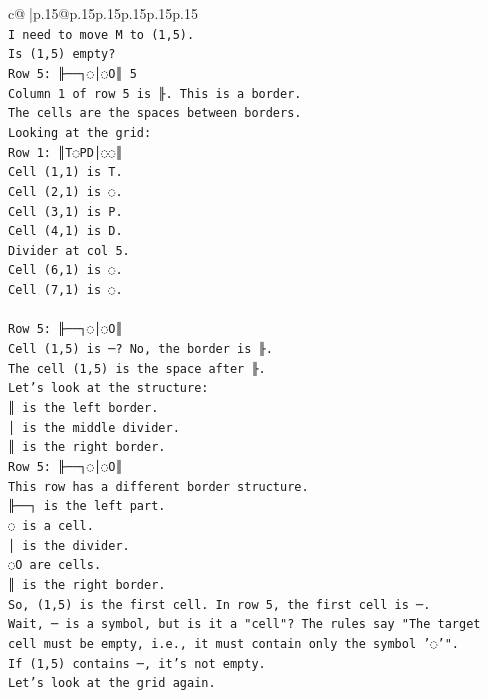 \documentclass{article}
\begin{document}
{\begin{supertabular}{c@{$\;$}|p{.15\linewidth}@{}p{.15\linewidth}p{.15\linewidth}p{.15\linewidth}p{.15\linewidth}p{.15\linewidth}}
{{{\\ 
\texttt{I need to move M to (1,5).} \\
\texttt{Is (1,5) empty?} \\
\texttt{Row 5: ╟──┐◌│◌O║ 5} \\
\texttt{Column 1 of row 5 is ╟. This is a border.} \\
\texttt{The cells are the spaces between borders.} \\
\texttt{Looking at the grid:} \\
\texttt{Row 1: ║T◌PD│◌◌║} \\
\texttt{Cell (1,1) is T.} \\
\texttt{Cell (2,1) is ◌.} \\
\texttt{Cell (3,1) is P.} \\
\texttt{Cell (4,1) is D.} \\
\texttt{Divider at col 5.} \\
\texttt{Cell (6,1) is ◌.} \\
\texttt{Cell (7,1) is ◌.} \\
\\ 
\texttt{Row 5: ╟──┐◌│◌O║} \\
\texttt{Cell (1,5) is ─? No, the border is ╟.} \\
\texttt{The cell (1,5) is the space after ╟.} \\
\texttt{Let's look at the structure:} \\
\texttt{║ is the left border.} \\
\texttt{│ is the middle divider.} \\
\texttt{║ is the right border.} \\
\texttt{Row 5: ╟──┐◌│◌O║} \\
\texttt{This row has a different border structure.} \\
\texttt{╟──┐ is the left part.} \\
\texttt{◌ is a cell.} \\
\texttt{│ is the divider.} \\
\texttt{◌O are cells.} \\
\texttt{║ is the right border.} \\
\texttt{So, (1,5) is the first cell. In row 5, the first cell is ─.} \\
\texttt{Wait, ─ is a symbol, but is it a "cell"? The rules say "The target cell must be empty, i.e., it must contain only the symbol '◌'".} \\
\texttt{If (1,5) contains ─, it's not empty.} \\
\texttt{Let's look at the grid again.} \\
}}}
\end{supertabular}}
\end{document}
